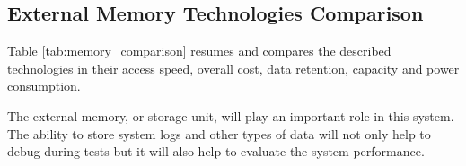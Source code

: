 \subsection{External Memory Technologies Comparison}
Table \ref{tab:memory_comparison} resumes and compares the described technologies in their access speed, overall cost, data retention, capacity and power consumption.
\begin{table}[H]
    \centering
    \caption{Comparison of External Memory Technologies}
    \label{tab:memory_comparison}
\end{table}

The external memory, or storage unit, will play an important role in this system.
The ability to store system logs and other types of data will not only help to debug during tests but it will also help to evaluate the system performance.

